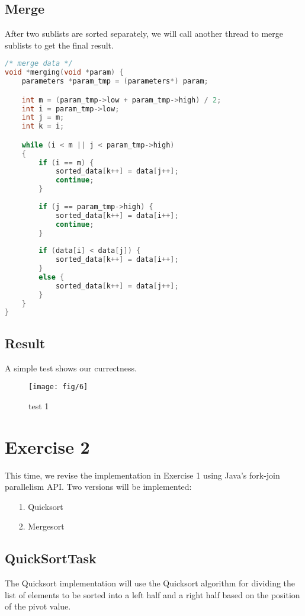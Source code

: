 \documentclass{article}
\begin{document}
\subsection*{Merge}
After two sublists are sorted separately, we will call another thread to merge sublists to get the final result.

\begin{lstlisting}[language=c, caption={Merge}, captionpos=b]
/* merge data */
void *merging(void *param) {
    parameters *param_tmp = (parameters*) param;

    int m = (param_tmp->low + param_tmp->high) / 2;
    int i = param_tmp->low;
    int j = m;
    int k = i;

    while (i < m || j < param_tmp->high)
    {        
        if (i == m) {
            sorted_data[k++] = data[j++];
            continue;
        }
        
        if (j == param_tmp->high) {
            sorted_data[k++] = data[i++];
            continue;
        }
        
        if (data[i] < data[j]) {
            sorted_data[k++] = data[i++];
        }
        else {
            sorted_data[k++] = data[j++];
        }
    }
}
\end{lstlisting}

\subsection*{Result}
A simple test shows our currectness.

\begin{figure}[h]
    \centering
    
    \texttt{[image: fig/6]}
    \caption{test 1}
    \label{1}
\end{figure}

\section*{Exercise 2}
This time, we revise the implementation in Exercise 1 using Java's fork-join parallelism API. Two versions will be implemented:

\begin{itemize}
    \item[1.] Quicksort
    \item[2.] Mergesort 
\end{itemize}

\subsection*{QuickSortTask}
The Quicksort implementation will use the Quicksort algorithm for dividing
the list of elements to be sorted into a left half and a right half based on the position of the pivot value. 
\end{document}
